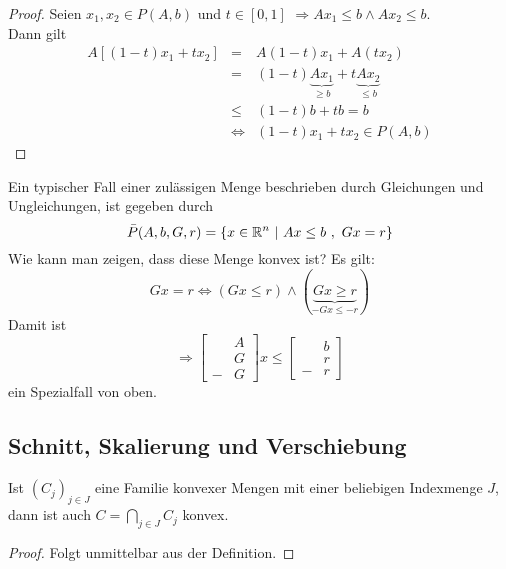 \begin{enumerate}[label=\emph{\alph*})]
	\begin{proof}
	Seien $x_1,x_2\in P(A,b)$ und $t\in\left[0,1\right]$ $\Rightarrow Ax_1\leq b \wedge Ax_2\leq b$.\\ Dann gilt
	\begin{eqnarray*}
		A\left[(1-t)x_1+tx_2 \right] & = & A(1-t)x_1+A(tx_2)\\
									& = & (1-t)\underbrace{Ax_1}_{\geq b}+t\underbrace{Ax_2}_{\leq b}\\
									& \leq & (1-t)b + tb =b\\
									& \Leftrightarrow & (1-t)x_1+tx_2 \in P(A,b)
	\end{eqnarray*}
	\end{proof}
	\begin{Bemerkung}
		Ein typischer Fall einer zul\"assigen Menge beschrieben durch Gleichungen und Ungleichungen, ist gegeben durch
		\begin{equation*}
			\bar{P}(A,b,G,r) = \lbrace x\in \mathbb R^n ~\vert~ Ax\leq b~,~Gx=r\rbrace
		\end{equation*}
		Wie kann man zeigen, dass diese Menge konvex ist?
		Es gilt:
		\begin{equation*}
			Gx=r \Leftrightarrow \left( Gx\leq r \right) \wedge ( \underbrace{Gx\geq r}_{-Gx\leq -r})
		\end{equation*}
		Damit ist
		 \begin{equation*}
			\Rightarrow \begin{bmatrix}&A\\&G\\-&G\end{bmatrix}x\leq \begin{bmatrix}&b\\&r\\-&r
			\end{bmatrix}
		 \end{equation*} 
		 ein Spezialfall von oben.
	\end{Bemerkung}
\end{enumerate}
\subsection{Schnitt, Skalierung und Verschiebung}
\begin{Lemma}Ist $\left(C_j \right)_{j\in J}$ eine Familie konvexer Mengen mit einer beliebigen Indexmenge $J$, dann ist auch $C=\bigcap\limits_{j\in J} C_j$ konvex.
\end{Lemma}
\begin{proof}
	Folgt unmittelbar aus der Definition.
\end{proof}

